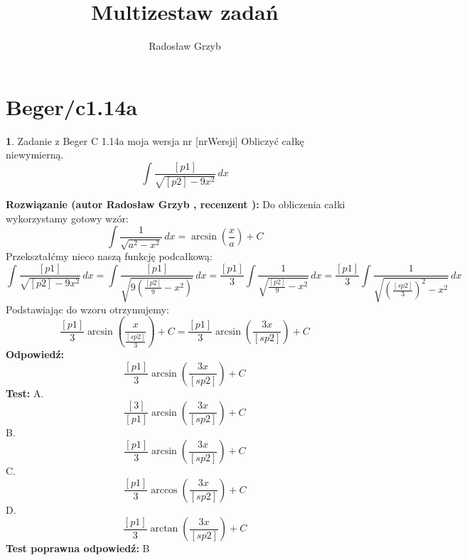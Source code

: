 \documentclass[12pt, a4paper]{article}
\title{Multizestaw zadań}
\author{Radosław Grzyb}
\date{}
\theoremstyle{definition} %
\newtheorem{zad}{}
\newcommand{\kategoria}[1]{\section{#1}} %
\newcommand{\zadStart}[1]{\begin{zad}#1\newline} %
\newcommand{\zadStop}{\end{zad}}   %
\newcommand{\rozwStart}[2]{\noindent \textbf{Rozwiązanie (autor #1 , recenzent #2): }\newline} %
\newcommand{\rozwStop}{\newline}                                            %
\newcommand{\odpStart}{\noindent \textbf{Odpowiedź:}\newline}    %
\newcommand{\odpStop}{\newline}                                             %
\newcommand{\testStart}{\noindent \textbf{Test:}\newline} %
\newcommand{\testStop}{\newline} %
\newcommand{\kluczStart}{\noindent \textbf{Test poprawna odpowiedź:}\newline} %
\newcommand{\kluczStop}{\newline} %
\begin{document}
\maketitle
\kategoria{Beger/c1.14a}
\zadStart{Zadanie z Beger C 1.14a moja wersja nr [nrWersji]}
Obliczyć całkę niewymierną.
$$\int \frac{[p1]}{\sqrt{[p2]-9x^{2}}} \,dx$$
\zadStop
\rozwStart{Radosław Grzyb}{}
Do obliczenia całki wykorzystamy gotowy wzór:
$$\int \frac{1}{\sqrt{a^{2}-x^{2}}} \,dx = \arcsin(\frac{x}{a})+C$$
Przekształćmy nieco naszą funkcję podcałkową:
$$\int \frac{[p1]}{\sqrt{[p2]-9x^{2}}} \,dx = \int \frac{[p1]}{\sqrt{9(\frac{[p2]}{9}-x^{2})}} \,dx = \frac{[p1]}{3}\int \frac{1}{\sqrt{\frac{[p2]}{9}-x^{2}}} \,dx = \frac{[p1]}{3}\int \frac{1}{\sqrt{(\frac{[sp2]}{3})^{2}-x^{2}}} \,dx  $$
Podstawiając do wzoru otrzymujemy:
$$\frac{[p1]}{3}\arcsin(\frac{x}{\frac{[sp2]}{3}})+C=\frac{[p1]}{3}\arcsin(\frac{3x}{[sp2]})+C$$
\rozwStop
\odpStart
$$\frac{[p1]}{3}\arcsin(\frac{3x}{[sp2]})+C$$
\odpStop
\testStart
A.$$\frac{[3]}{[p1]}\arcsin(\frac{3x}{[sp2]})+C$$
B.$$\frac{[p1]}{3}\arcsin(\frac{3x}{[sp2]})+C$$
C.$$\frac{[p1]}{3}\arccos(\frac{3x}{[sp2]})+C$$
D.$$\frac{[p1]}{3}\arctan(\frac{3x}{[sp2]})+C$$
\testStop
\kluczStart
B
\kluczStop
\end{document}
